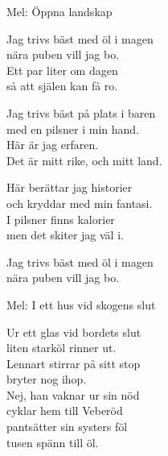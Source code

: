 \pagestyle{Öhlvisor}
\begin{SongText}[Trivsel]
    \begin{SongInfo}
        Mel: Öppna landskap
    \end{SongInfo}
    \begin{SongVerse}
        Jag trivs bäst med öl i magen\\%
        nära puben vill jag bo.\\%
        Ett par liter om dagen\\%
        så att själen kan få ro.
    \end{SongVerse}
    \begin{SongVerse}
        Jag trivs bäst på plats i baren\\%
        med en pilsner i min hand.\\%
        Här är jag erfaren.\\%
        Det är mitt rike, och mitt land.
    \end{SongVerse}
    \begin{SongVerse}
        Här berättar jag historier\\%
        och kryddar med min fantasi.\\%
        I pilsner finns kalorier\\%
        men det skiter jag väl i.
    \end{SongVerse}
    \begin{SongVerse}
        Jag trivs bäst med öl i magen\\%
        nära puben vill jag bo.
    \end{SongVerse}
\end{SongText}
\begin{SongText}[Hästhandlar’n]
    \begin{SongInfo}
        Mel: I ett hus vid skogens slut
    \end{SongInfo}
    \begin{SongVerse}
        Ur ett glas vid bordets slut\\%
        liten starköl rinner ut.\\%
        Lennart stirrar på sitt stop\\%
        bryter nog ihop.\\%
        Nej, han vaknar ur sin nöd\\%
        cyklar hem till Veberöd\\%
        pantsätter sin systers föl\\%
        tusen spänn till öl.
    \end{SongVerse}
\end{SongText}
